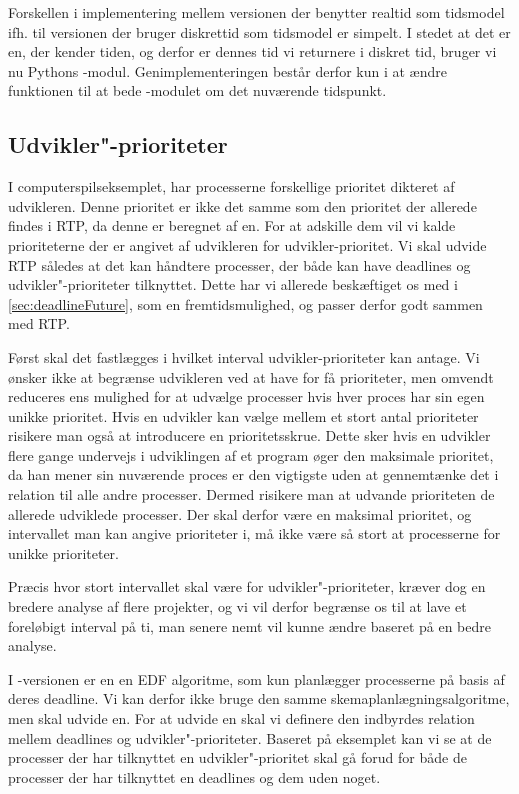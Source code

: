 Forskellen i implementering mellem versionen der benytter realtid som tidsmodel ifh. til versionen der bruger diskrettid som tidsmodel er simpelt. I stedet at det er \sched en, der kender tiden, og derfor er dennes tid vi returnere i diskret tid, bruger vi nu Pythons -modul. Genimplementeringen består derfor kun i at ændre funktionen  til at bede -modulet om det nuværende tidspunkt. 

\subsection{Udvikler"-prioriteter}
I computerspilseksemplet, har processerne forskellige prioritet dikteret af udvikleren. Denne prioritet er ikke det samme som den prioritet der allerede findes i RTP, da denne  er beregnet af \sched en. For at adskille dem vil vi kalde prioriteterne der er angivet af udvikleren for udvikler-prioritet. Vi skal udvide RTP således at det kan håndtere processer, der både kan have deadlines og udvikler"-prioriteter tilknyttet. Dette har vi allerede beskæftiget os med i \cref{sec:deadlineFuture}, som en fremtidsmulighed, og passer derfor godt sammen med RTP.

Først skal det fastlægges i hvilket interval udvikler-prioriteter kan antage. Vi ønsker ikke at begrænse udvikleren ved at have for få prioriteter, men omvendt reduceres \sched ens  mulighed for at udvælge processer hvis hver proces har sin egen unikke prioritet. Hvis en udvikler kan vælge mellem et stort antal prioriteter risikere man også at introducere en prioritetsskrue. Dette sker hvis en udvikler flere gange undervejs i udviklingen af et program øger den maksimale prioritet, da han mener sin nuværende proces er den vigtigste uden at gennemtænke det i relation til alle andre processer. Dermed risikere man at udvande prioriteten de allerede udviklede processer.  Der skal derfor være en maksimal prioritet, og intervallet man kan angive prioriteter i, må ikke være så stort at processerne for unikke prioriteter.

Præcis  hvor stort intervallet skal være for udvikler"-prioriteter, kræver dog en bredere analyse af flere projekter, og vi vil derfor begrænse os til at lave et foreløbigt interval på ti, man senere nemt vil kunne ændre baseret på en bedre analyse.


I -versionen er \sched en en EDF algoritme, som kun planlægger processerne på basis af deres deadline. Vi kan derfor ikke bruge den samme skemaplanlægningsalgoritme, men skal udvide \sched en. For at udvide \sched en skal vi definere den indbyrdes relation mellem deadlines og udvikler"-prioriteter. Baseret på eksemplet kan vi se at de processer der har  tilknyttet en udvikler"-prioritet skal gå forud for både de processer der har tilknyttet en deadlines og dem uden noget. 

